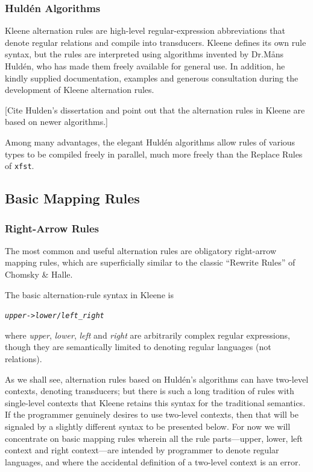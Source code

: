 \documentclass[letterpaper,12pt]{article}
\begin{document}
\subsubsection{Huld\'en Algorithms}

Kleene alternation rules are high-level regular-expression abbreviations that denote
regular relations and compile into transducers.  Kleene defines its own rule syntax, but the rules are interpreted using
algorithms
invented by Dr.\@ M\r{a}ns Huld\'en, who has made them freely available for
general use.  In addition, he kindly supplied documentation, examples and generous
consultation during the development of Kleene alternation rules.

[Cite Hulden's dissertation and point out that the alternation rules in Kleene are
based on newer algorithms.]

Among many advantages, the elegant Huld\'en algorithms allow rules of various types
to be compiled freely in parallel, much more freely than the Replace Rules of
\texttt{xfst}. 

\subsection{Basic Mapping Rules}

\subsubsection{Right-Arrow Rules}

The most common and useful alternation rules are obligatory right-arrow mapping rules, which are
superficially similar to the classic ``Rewrite Rules'' of Chomsky \& Halle.

The basic alternation-rule syntax in Kleene is

\begin{alltt}
\emph{upper} -> \emph{lower} / \emph{left} _ \emph{right}
\end{alltt}

\noindent
where \emph{upper}, \emph{lower}, \emph{left} and \emph{right} are
arbitrarily complex regular expressions, though they are semantically limited to
denoting regular languages (not relations).   

\noindent
As we shall see, alternation rules
based on Huld\'en's algorithms can have two-level contexts, denoting transducers; but there is such a long
tradition of rules with single-level contexts that Kleene retains this syntax for the traditional
semantics.  If the programmer genuinely desires to use two-level contexts, then that will be
signaled by a slightly different syntax to be presented below.
For now we will
concentrate on basic mapping rules wherein all the rule parts---upper, lower, left
context and right context---are intended by programmer to denote regular languages,
and where the accidental definition of a two-level context is an error.
\end{document}
